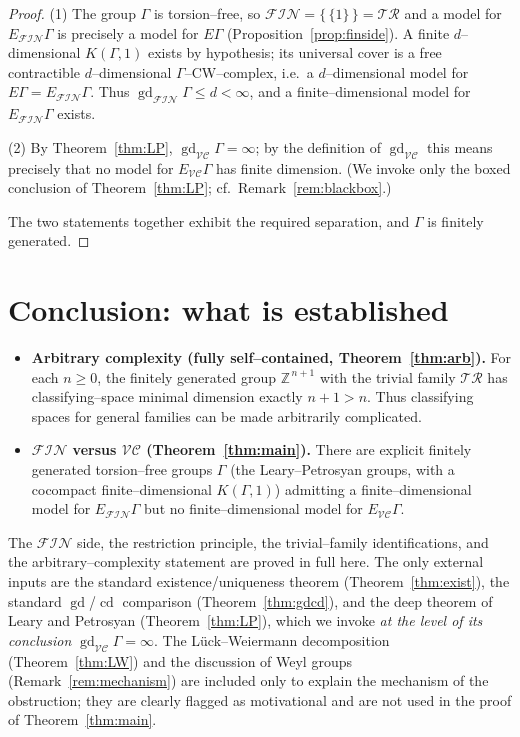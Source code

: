 \documentclass{amsart}
\theoremstyle{definition}
\newcommand{\Z}{\mathbb{Z}}
\newcommand{\FIN}{\mathcal{F\!I\!N}}
\newcommand{\VC}{\mathcal{V\!C}}
\newcommand{\gd}{\operatorname{gd}}
\newcommand{\cd}{\operatorname{cd}}
\begin{document}
\begin{proof}
(1) The group $\Gamma$ is torsion--free, so $\FIN=\{\,\{1\}\,\}=\mathcal{TR}$ and a model for
$E_{\FIN}\Gamma$ is precisely a model for $E\Gamma$ (Proposition~\ref{prop:finside}). A finite
$d$--dimensional $K(\Gamma,1)$ exists by hypothesis; its universal cover is a free contractible
$d$--dimensional $\Gamma$--CW--complex, i.e.\ a $d$--dimensional model for
$E\Gamma=E_{\FIN}\Gamma$. Thus $\gd_{\FIN}\Gamma\le d<\infty$, and a finite--dimensional model
for $E_{\FIN}\Gamma$ exists.

(2) By Theorem~\ref{thm:LP}, $\gd_{\VC}\Gamma=\infty$; by the definition of $\gd_{\VC}$ this
means precisely that no model for $E_{\VC}\Gamma$ has finite dimension. (We invoke only the
boxed conclusion of Theorem~\ref{thm:LP}; cf.\ Remark~\ref{rem:blackbox}.)

The two statements together exhibit the required separation, and $\Gamma$ is finitely
generated.
\end{proof}

\section{Conclusion: what is established}

\begin{itemize}
\item \textbf{Arbitrary complexity (fully self--contained, Theorem~\ref{thm:arb}).} For each
$n\ge 0$, the finitely generated group $\Z^{\,n+1}$ with the trivial family $\mathcal{TR}$ has
classifying--space minimal dimension exactly $n+1>n$. Thus classifying spaces for general
families can be made arbitrarily complicated.

\item \textbf{$\FIN$ versus $\VC$ (Theorem~\ref{thm:main}).} There are explicit finitely
generated torsion--free groups $\Gamma$ (the Leary--Petrosyan groups, with a cocompact
finite--dimensional $K(\Gamma,1)$) admitting a finite--dimensional model for $E_{\FIN}\Gamma$ but no
finite--dimensional model for $E_{\VC}\Gamma$.
\end{itemize}

The $\FIN$ side, the restriction principle, the trivial--family identifications, and the
arbitrary--complexity statement are proved in full here. The only external inputs are the
standard existence/uniqueness theorem (Theorem~\ref{thm:exist}), the standard
$\gd$/$\cd$ comparison (Theorem~\ref{thm:gdcd}), and the deep theorem of Leary and Petrosyan
(Theorem~\ref{thm:LP}), which we invoke \emph{at the level of its conclusion}
$\gd_{\VC}\Gamma=\infty$. The Lück--Weiermann decomposition (Theorem~\ref{thm:LW}) and the
discussion of Weyl groups (Remark~\ref{rem:mechanism}) are included only to explain the
mechanism of the obstruction; they are clearly flagged as motivational and are not used in the
proof of Theorem~\ref{thm:main}.
\end{document}
